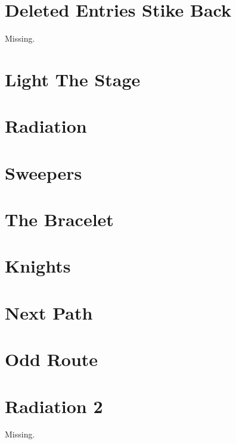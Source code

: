 \documentclass[a4paper, 10pt]{article}
\let\stdsection\section
\renewcommand\section{\newpage\stdsection}
\newcommand{\includecode}[1]{
    }
\begin{document}
    \section{Deleted Entries Stike Back}
        Missing.
        
    \section{Light The Stage}
        \includecode{../problems/w12/LightTheStage/LightTheStage1.cpp}
        
    \section{Radiation}
        \includecode{../problems/w12/Radiation/Radiation1.cpp}
        
    \section{Sweepers}
        \includecode{../problems/w12/Sweepers/Sweepers1.cpp}
        
    \section{The Bracelet}
        \includecode{../problems/w12/The_Bracelet/Bracelet1.cpp}
        
    
    \section{Knights}
        \includecode{../problems/w13/Knights/Knights1.cpp}
        
    \section{Next Path}
        \includecode{../problems/w13/NextPath/NextPath1.cpp}
        
    \section{Odd Route}
        \includecode{../problems/w13/OddRoute/OddRoute1.cpp}
        
    \section{Radiation 2}
        Missing.
    
\end{document}
